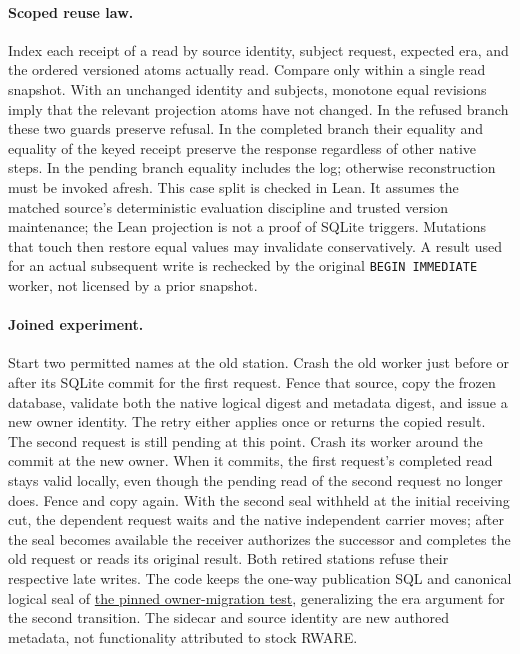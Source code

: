 \documentclass[11pt]{article}
\begin{document}
\paragraph{Scoped reuse law.}
Index each receipt of a read by source identity, subject request,
expected era, and the ordered versioned atoms actually read. Compare
only within a single read snapshot. With an unchanged identity and
subjects, monotone equal revisions imply that the relevant projection
atoms have not changed. In the refused branch these two guards
preserve refusal. In the completed branch their equality and equality
of the keyed receipt preserve the response regardless of other
native steps. In the pending branch equality includes the log;
otherwise reconstruction must be invoked afresh. This case split is
checked in Lean. It assumes the matched source's deterministic
evaluation discipline and trusted version maintenance; the Lean
projection is not a proof of SQLite triggers. Mutations that touch
then restore equal values may invalidate conservatively. A result
used for an actual subsequent write is rechecked by the original
\texttt{BEGIN IMMEDIATE} worker, not licensed by a prior snapshot.

\paragraph{Joined experiment.}
Start two permitted names at the old station. Crash the old worker
just before or after its SQLite commit for the first request.
Fence that source, copy the frozen database, validate both the native
logical digest and metadata digest, and issue a new owner identity.
The retry either applies once or returns the copied result. The
second request is still pending at this point. Crash its worker
around the commit at the new owner. When it commits, the first
request's completed read stays valid locally, even though the pending
read of the second request no longer does. Fence and copy again.
With the second seal withheld at the initial receiving cut, the
dependent request waits and the native independent carrier moves;
after the seal becomes available the receiver authorizes the successor
and completes the old request or reads its original result.
Both retired stations refuse their respective late writes. The code
keeps the one-way publication SQL and canonical logical seal of
\href{https://github.com/eternal-november/eos-research-programmes/pull/643}{the
pinned owner-migration test}, generalizing the era argument for the
second transition. The sidecar and source identity are new authored
metadata, not functionality attributed to stock RWARE.
\end{document}
